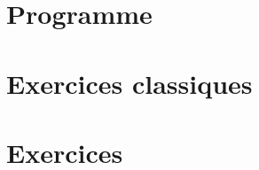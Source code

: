 \documentclass[12pt,french]{report}
\begin{document}
\begin{spacing}{1.2}
\section{Programme}




\section{Exercices classiques}


\begin{Exo}[]

\end{Exo}

\medskip

\begin{Exo}[]

\end{Exo}

\medskip

\begin{Exo}[]

\end{Exo}

\medskip

\begin{Exo}[]

\end{Exo}

\medskip

\begin{Exo}[]

\end{Exo}

\medskip

\begin{Exo}[]

\end{Exo}


\section{Exercices}
\label{exo1}
\begin{Exercice}[]%






\end{Exercice}
\end{spacing}
\end{document}
